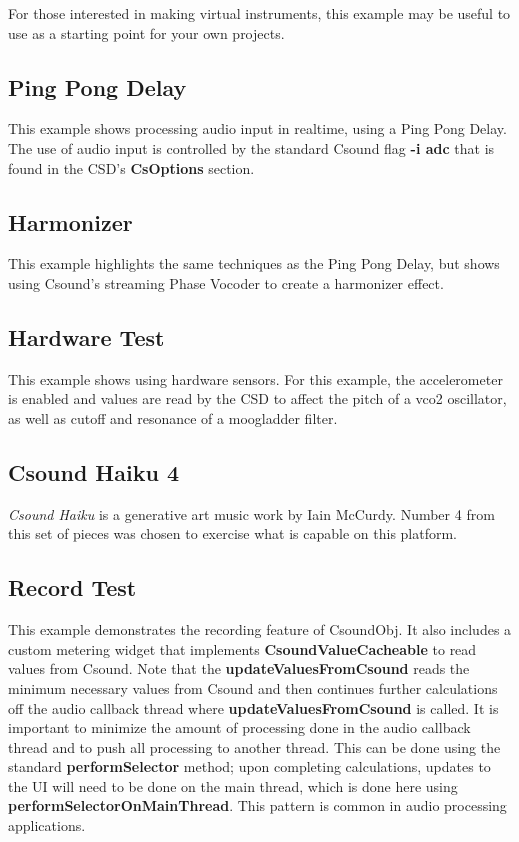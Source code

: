 \documentclass[11pt]{article}
\begin{document}
For those interested in making virtual instruments, this example may be useful to use as a starting point for your own projects.

\subsection{Ping Pong Delay}

This example shows processing audio input in realtime, using a Ping Pong Delay. The use of audio input is controlled by the standard Csound flag \textbf{-i adc} that is found in the CSD's \textbf{CsOptions} section.  


\subsection{Harmonizer}

This example highlights the same techniques as the Ping Pong Delay, but shows using Csound's streaming Phase Vocoder to create a harmonizer effect. 

\subsection{Hardware Test}

This example shows using hardware sensors.  For this example, the accelerometer is enabled and values are read by the CSD to affect the pitch of a vco2 oscillator, as well as cutoff and resonance of a moogladder filter. 

\subsection{Csound Haiku 4}

\emph{Csound Haiku} is a generative art music work by Iain McCurdy.  Number 4 from this set of pieces was chosen to exercise what is capable on this platform.

\subsection{Record Test}

This example demonstrates the recording feature of CsoundObj.  It also includes a custom metering widget that implements \textbf{CsoundValueCacheable} to read values from Csound.  Note that the \textbf{updateValuesFromCsound} reads the minimum necessary values from Csound and then continues further calculations off the audio callback thread where \textbf{updateValuesFromCsound} is called.  It is important to minimize the amount of processing done in the audio callback thread and to push all processing to another thread.  This can be done using the standard \textbf{performSelector} method; upon completing calculations, updates to the UI will need to be done on the main thread, which is done here using \textbf{performSelectorOnMainThread}.  This pattern is common in audio processing applications. 
\end{document}
